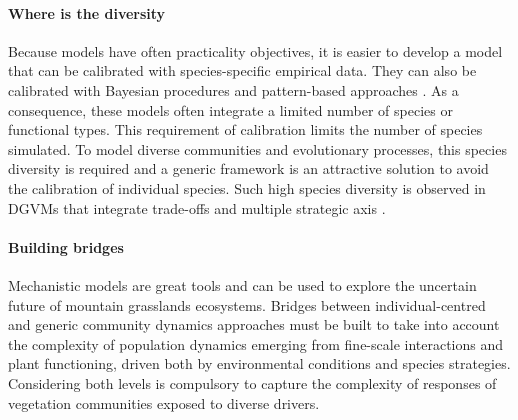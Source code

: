\paragraph{Where is the diversity}
Because models have often practicality objectives, it is easier to develop a model that can be calibrated with species-specific empirical data. They can also be calibrated with Bayesian procedures and pattern-based approaches \parencite{hartig_statistical_2011}. As a consequence, these models often integrate a limited number of species or functional types. This requirement of calibration limits the number of species simulated. To model diverse communities and evolutionary processes, this species diversity is required and a generic framework is an attractive solution to avoid the calibration of individual species. Such high species diversity is observed in DGVMs that integrate trade-offs and multiple strategic axis \parencite{kleidon_global_2000, pavlick_jena_2013}.

\paragraph{Building bridges}
Mechanistic models are great tools and can be used to explore the uncertain future of mountain grasslands ecosystems. Bridges between individual-centred and generic community dynamics approaches must be built to take into account the complexity of population dynamics emerging from fine-scale interactions and plant functioning, driven both by environmental conditions and species strategies. Considering both levels is compulsory to capture the complexity of responses of vegetation communities exposed to diverse drivers.

%
%
%

